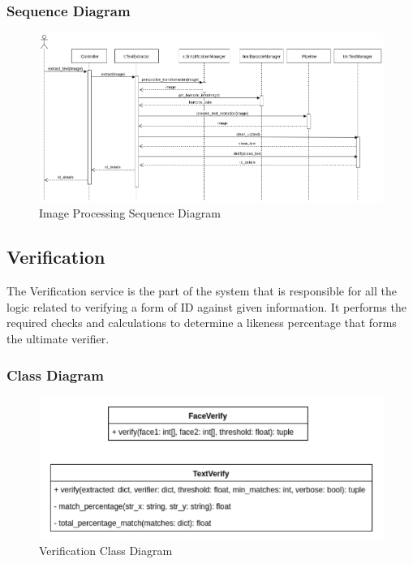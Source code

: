 \documentclass{article}
\begin{document}
\subsubsection{Sequence Diagram}
\begin{figure}[H]
	    \centering
	    \includegraphics[scale=0.5]{img/extract_sequence.png}
	    \caption{Image Processing Sequence Diagram}
	 \end{figure}
	 \pagebreak
	 
\subsection{Verification}
The Verification service is the part of the system that is responsible for all the logic related to verifying a form of ID against given information. It performs the required checks and calculations to determine a likeness percentage that forms the ultimate verifier.
\subsubsection{Class Diagram}
	\begin{figure}[H]
	    \centering
	    \includegraphics[scale=0.5]{img/VerifyClass.png}
	    \caption{Verification Class Diagram}
	 \end{figure}
	 \pagebreak
\end{document}
